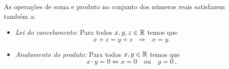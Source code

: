    As operações de soma e produto no conjunto dos números reais satisfazem também a:
   \begin{itemize}
   \item \textit{Lei do cancelamento:} Para todos $x, y, z \in \mathbb{R}$  temos que
\begin{equation*}
x+z=y+z \ \ \ \Rightarrow \ \ \ x=y  . 
\end{equation*}
   \item \textit{Anulamento do produto:} Para todos $x, y \in \mathbb{R}$  temos que
\begin{equation*}
x \cdot y= 0 \Leftrightarrow x=0 \ \ \ \text{ ou } \ \ \ y=0 \ .
\end{equation*}
   \end{itemize}






